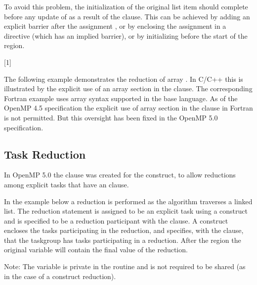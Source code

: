 To avoid this problem, the initialization of the original list item  
should complete before any update of  as a result of the  
clause. This can be achieved by adding an explicit barrier after the assignment 
, or by enclosing the assignment  in a  
directive (which has an implied barrier), or by initializing  before 
the start of the  region.


[1]

The following example demonstrates the reduction of array .  In C/C++ this is illustrated by the explicit use of an array section  in the  clause.  The corresponding Fortran example uses array syntax supported in the base language.  As of the OpenMP 4.5 specification the explicit use of array section in the  clause in Fortran is not permitted.  But this oversight has been fixed in the OpenMP 5.0 specification.




\subsection{Task Reduction}
\label{subsec:task_reduction}

In OpenMP 5.0 the  clause was created for the  construct, 
to allow reductions among explicit tasks that have an  clause.

In the  example below a reduction is performed as the algorithm
traverses a linked list. The reduction statement is assigned to be an explicit task using
a  construct and is specified to be a reduction participant with 
the  clause.
A  construct encloses the tasks participating in the reduction, and
specifies, with the  clause, that the taskgroup has tasks participating
in a reduction.  After the  region the original variable will contain 
the final value of the reduction.

Note: The  variable is private in the  routine
and is not required to be shared (as in the case of a  construct
reduction).




